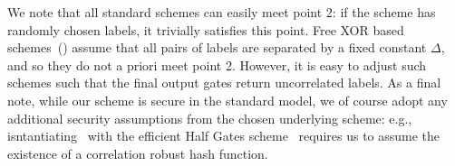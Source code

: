 We note that all standard schemes can easily meet point 2:
if the scheme has randomly chosen labels, it trivially satisfies this
point.
%
Free XOR based schemes~(\cite{ICALP:KolSch08}) assume that all
pairs of labels are separated by a fixed constant $\Delta$, and so
they do not a priori meet point 2. However, it is easy to adjust such
schemes such that the final output gates return uncorrelated labels.
%
As a final note, while our scheme is secure in the standard model, we
of course adopt any additional security assumptions from the chosen
underlying scheme: e.g., isntantiating \ourscheme\ with the efficient
Half Gates scheme~\cite{EPRINT:ZahRosEva14} requires us to assume the
existence of a correlation robust hash function.
